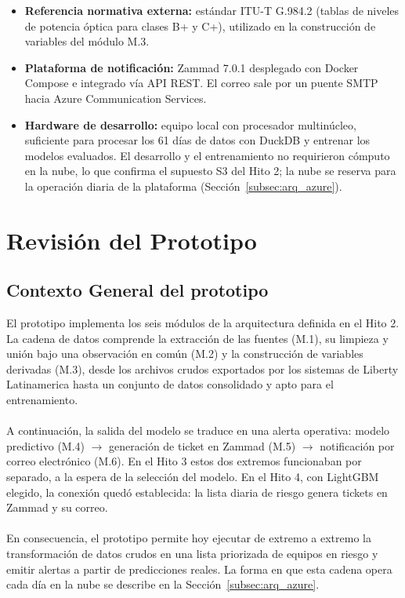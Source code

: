 \documentclass[12pt,a4paper]{article}
\begin{document}
\begin{itemize}
    \item \textbf{Referencia normativa externa:} estándar ITU-T G.984.2 (tablas de niveles de potencia óptica para clases B+ y C+), utilizado en la construcción de variables del módulo M.3.

    \item \textbf{Plataforma de notificación:} Zammad 7.0.1 desplegado con Docker Compose e integrado vía API REST. El correo sale por un puente SMTP hacia Azure Communication Services.

    \item \textbf{Hardware de desarrollo:} equipo local con procesador multinúcleo, suficiente para procesar los 61 días de datos con DuckDB y entrenar los modelos evaluados. El desarrollo y el entrenamiento no requirieron cómputo en la nube, lo que confirma el supuesto S3 del Hito 2; la nube se reserva para la operación diaria de la plataforma (Sección~\ref{subsec:arq_azure}).
\end{itemize}


\section{Revisión del Prototipo}
\subsection{Contexto General del prototipo}
\noindent
El prototipo implementa los seis módulos de la arquitectura definida en el Hito 2. La cadena de datos comprende la extracción de las fuentes (M.1), su limpieza y unión bajo una observación en común (M.2) y la construcción de
variables derivadas (M.3), desde los archivos crudos exportados por los sistemas de Liberty Latinamerica hasta un conjunto de datos consolidado y apto para el entrenamiento.\\\\

\noindent
A continuación, la salida del modelo se traduce en una alerta operativa: modelo predictivo (M.4) $\rightarrow$ generación de ticket en Zammad (M.5) $\rightarrow$ notificación por correo electrónico (M.6).
En el Hito 3 estos dos extremos funcionaban por separado, a la espera de la selección del modelo. En el Hito 4, con LightGBM elegido, la conexión quedó establecida: la lista diaria de riesgo genera tickets en Zammad y su correo.\\\\

\noindent
En consecuencia, el prototipo permite hoy ejecutar de extremo a extremo la transformación de datos crudos en una lista priorizada de equipos en riesgo y emitir alertas a partir de predicciones reales. La forma en que esta cadena opera cada día en la nube se describe en la Sección~\ref{subsec:arq_azure}.
\end{document}
